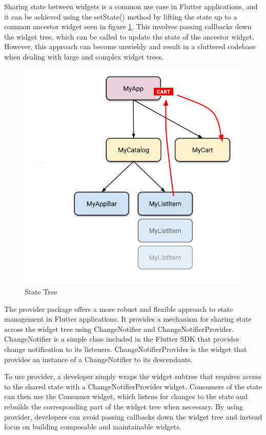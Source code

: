 \documentclass[conference]{IEEEtran}
\begin{document}
Sharing state between widgets is a common use case in Flutter applications, and it can be achieved using the setState() method by lifting the state up to a common ancestor widget seen in figure \ref{fig:state_tree}. This involves passing callbacks down the widget tree, which can be called to update the state of the ancestor widget. However, this approach can become unwieldy and result in a cluttered codebase when dealing with large and complex widget trees.


\begin{figure}[ht]
	\centerline{\includegraphics[width=\linewidth]{figures/state_management_tree}}
	\caption{State Tree}
	\label{fig:state_tree}
\end{figure}


The provider package offers a more robust and flexible approach to state management in Flutter applications. It provides a mechanism for sharing state across the widget tree using ChangeNotifier and ChangeNotifierProvider. ChangeNotifier is a simple class included in the Flutter SDK that provides change notification to its listeners. ChangeNotifierProvider is the widget that provides an instance of a ChangeNotifier to its descendants.

To use provider, a developer simply wraps the widget subtree that requires access to the shared state with a ChangeNotifierProvider widget. Consumers of the state can then use the Consumer widget, which listens for changes to the state and rebuilds the corresponding part of the widget tree when necessary. By using provider, developers can avoid passing callbacks down the widget tree and instead focus on building composable and maintainable widgets.
\end{document}
